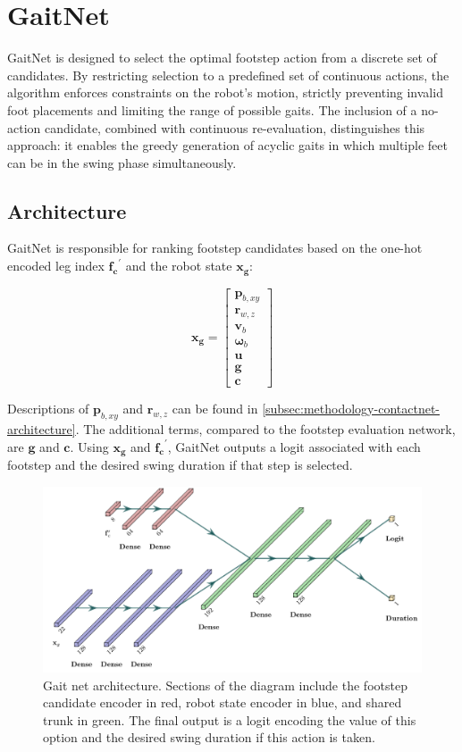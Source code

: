 \section{GaitNet}
\label{sec:methodology-gaitnet}

GaitNet is designed to select the optimal footstep action from a
discrete set of candidates. By restricting selection to a predefined
set of continuous actions, the algorithm enforces constraints on the
robot's motion, strictly preventing invalid foot placements and
limiting the range of possible gaits. The inclusion of a no-action
candidate, combined with continuous re-evaluation, distinguishes this
approach: it enables the greedy generation of acyclic gaits in which
multiple feet can be in the swing phase simultaneously.

\subsection{Architecture}
\label{subsec:methodology-gaitnet-architecture}

GaitNet is responsible for ranking footstep candidates based on the
one-hot encoded leg index $\mathbf{f_c}^{\prime}$ and the robot state
$\mathbf{x_g}$:

\[
  \mathbf{x_g} =
  \begin{bmatrix}
    \mathbf p_{b,xy} \\
    \mathbf r_{w,z} \\
    \mathbf v_b \\
    \mathbf \omega_b \\
    \mathbf u \\
    \mathbf g \\
    \mathbf c
  \end{bmatrix}
\]

Descriptions of $\mathbf p_{b,xy}$ and $\mathbf r_{w,z}$ can be found
in \autoref{subsec:methodology-contactnet-architecture}. The
additional terms, compared to the footstep evaluation network, are
$\mathbf g$ and $\mathbf c$. Using $\mathbf{x_g}$ and
$\mathbf{f_c}^{\prime}$, GaitNet outputs a logit associated with each
footstep and the desired swing duration if that step is selected.

\begin{figure}[H]
  \centering
  \includegraphics[width=0.625\linewidth]{images/diagrams/gait-network-architecture.png}
  \caption{Gait net architecture. Sections of the diagram include the
    footstep candidate encoder in red,     robot state encoder in blue,
    and shared trunk in green.     The final output is a logit encoding
    the value of this option and the   desired swing duration if this
  action is taken.}
  \label{fig:diagram-gaitnet-architecture}
\end{figure}

